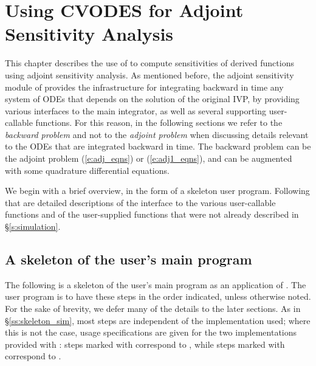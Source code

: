 \chapter{Using CVODES for Adjoint Sensitivity Analysis}\label{s:adjoint}

This chapter describes the use of {\cvodes} to compute sensitivities of derived 
functions using adjoint sensitivity analysis. As mentioned before, the adjoint
sensitivity module of {\cvodes} provides the infrastructure for integrating
backward in time any system of ODEs that depends on the solution of the original
IVP, by providing various interfaces to the main {\cvodes} integrator, as well 
as several supporting user-callable functions. For this reason, in the following
sections we refer to the {\em backward problem} and not to the 
{\em adjoint problem} when discussing details relevant to the ODEs that
are integrated backward in  time. The backward problem can be the adjoint problem
(\ref{e:adj_eqns}) or (\ref{e:adj1_eqns}), and
can be augmented with some quadrature differential equations.

We begin with a brief overview, in the form of a skeleton user program.
Following that are detailed descriptions of the interface to the
various user-callable functions and of the user-supplied functions that were not already
described in \S\ref{s:simulation}.
\section{A skeleton of the user's main program}\label{ss:skeleton_adj}
The following is a skeleton of the user's main program as an application of
{\cvodes}. The user program is to have these steps in the order indicated, 
unless otherwise noted. For the sake of brevity, we defer many of the details to 
the later sections.
As in \S\ref{ss:skeleton_sim}, most steps are independent of the {\nvector}
implementation used; where this is not the case, usage specifications are given for the
two implementations provided with {\cvodes}: steps marked with {\p} correspond to 
{\nvecp}, while steps marked with {\s} correspond to {\nvecs}.

